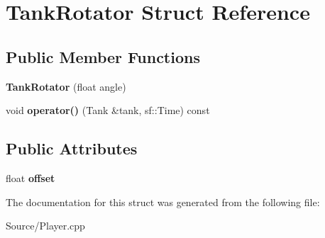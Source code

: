 \hypertarget{struct_tank_rotator}{}\section{Tank\+Rotator Struct Reference}
\label{struct_tank_rotator}
\subsection*{Public Member Functions}
\begin{DoxyCompactItemize}
\item 
\hypertarget{struct_tank_rotator_a74b8023d6a9b4d22b2b35dfa601aab6c}{}{\bfseries Tank\+Rotator} (float angle)\label{struct_tank_rotator_a74b8023d6a9b4d22b2b35dfa601aab6c}

\item 
\hypertarget{struct_tank_rotator_adfefdff1f215ce2d21fbb55a0b3ecfa1}{}void {\bfseries operator()} (Tank \&tank, sf\+::\+Time) const \label{struct_tank_rotator_adfefdff1f215ce2d21fbb55a0b3ecfa1}

\end{DoxyCompactItemize}
\subsection*{Public Attributes}
\begin{DoxyCompactItemize}
\item 
\hypertarget{struct_tank_rotator_a48b035d97b2363cfa915b393e258c12c}{}float {\bfseries offset}\label{struct_tank_rotator_a48b035d97b2363cfa915b393e258c12c}

\end{DoxyCompactItemize}


The documentation for this struct was generated from the following file\+:\begin{DoxyCompactItemize}
\item 
Source/Player.\+cpp\end{DoxyCompactItemize}
